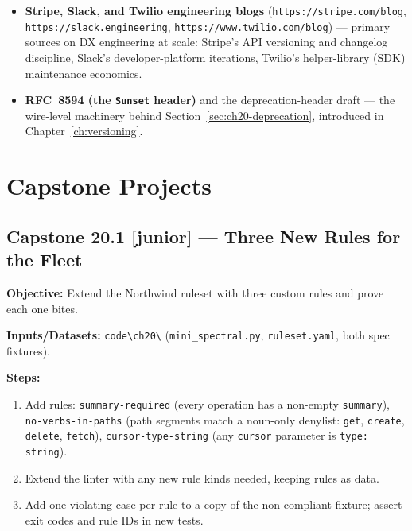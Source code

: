\begin{itemize}
        Table~\ref{tab:ch20-styleguide}.
  \item \textbf{Stripe, Slack, and Twilio engineering blogs}
        (\texttt{https://stripe.com/blog}, \texttt{https://slack.engineering},
        \texttt{https://www.twilio.com/blog}) --- primary sources on DX
        engineering at scale: Stripe's API versioning and changelog
        discipline, Slack's developer-platform iterations, Twilio's
        helper-library (SDK) maintenance economics.
  \item \textbf{RFC~8594 (the \texttt{Sunset} header)} and the
        deprecation-header draft --- the wire-level machinery behind
        Section~\ref{sec:ch20-deprecation}, introduced in
        Chapter~\ref{ch:versioning}.
\end{itemize}

\section{Capstone Projects}
\label{sec:ch20-capstones}

\subsection*{Capstone 20.1 [junior] --- Three New Rules for the Fleet}
\textbf{Objective:} Extend the Northwind ruleset with three custom rules
and prove each one bites.

\textbf{Inputs/Datasets:} \texttt{code\textbackslash{}ch20\textbackslash{}}
(\texttt{mini\_spectral.py}, \texttt{ruleset.yaml}, both spec fixtures).

\textbf{Steps:}
\begin{enumerate}
  \item Add rules: \texttt{summary-required} (every operation has a
        non-empty \texttt{summary}), \texttt{no-verbs-in-paths}
        (path segments match a noun-only denylist: \texttt{get},
        \texttt{create}, \texttt{delete}, \texttt{fetch}),
        \texttt{cursor-type-string} (any \texttt{cursor} parameter is
        \texttt{type: string}).
  \item Extend the linter with any new rule kinds needed, keeping rules
        as data.
  \item Add one violating case per rule to a copy of the non-compliant
        fixture; assert exit codes and rule IDs in new tests.
\end{enumerate}

